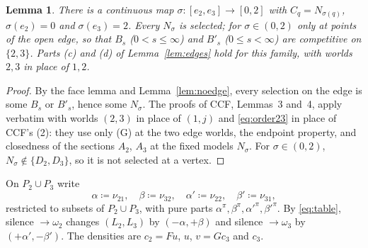 \documentclass[11pt]{article}
\newtheorem{lemma}[theorem]{Lemma}
\theoremstyle{definition}\newtheorem{definition}[theorem]{Definition}
\theoremstyle{remark}\newtheorem{remark}[theorem]{Remark}
\begin{document}
\begin{lemma}\label{lem:sel23}
There is a continuous map $\sigma\colon[e_2,e_3]\to[0,2]$ with
$C_q=N_{\sigma(q)}$, $\sigma(e_2)=0$ and $\sigma(e_3)=2$. Every $N_\sigma$ is
selected; for $\sigma\in(0,2)$ only at points of the open edge, so that
$B_s$ ($0<s\le\infty$) and $B'_s$ ($0\le s<\infty$) are competitive on
$\{2,3\}$. Parts (c) and (d) of Lemma~\ref{lem:edges} hold for this family,
with worlds $2,3$ in place of $1,2$.
\end{lemma}
\begin{proof}
By the face lemma and Lemma~\ref{lem:noedge}, every selection on the edge is
some $B_s$ or $B'_s$, hence some $N_\sigma$. The proofs of CCF, Lemmas~3
and~4, apply verbatim with worlds $(2,3)$ in place of $(1,j)$ and
\eqref{eq:order23} in place of CCF's (2): they use only (G) at the two edge
worlds, the endpoint property, and closedness of the sections $A_2$, $A_3$ at
the fixed models $N_\sigma$. For $\sigma\in(0,2)$, $N_\sigma\notin\{D_2,D_3\}$,
so it is not selected at a vertex.
\end{proof}

On $P_2\cup P_3$ write
\[
 \alpha\coloneqq\nu_{21},\quad\beta\coloneqq\nu_{32},\quad
 \alpha'\coloneqq\nu_{22},\quad\beta'\coloneqq\nu_{31},
\]
restricted to subsets of $P_2\cup P_3$, with pure parts $\alpha^\pi,\beta^\pi,
\alpha'^\pi,\beta'^\pi$. By \eqref{eq:table}, silence $\to\omega_2$ changes
$(L_2,L_3)$ by $(-\alpha,+\beta)$ and silence $\to\omega_3$ by
$(+\alpha',-\beta')$. The densities are $c_2=Fu$, $u$, $v=Gc_3$ and $c_3$.
\end{document}
